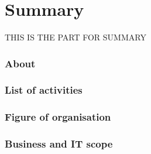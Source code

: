 \part{Summary}

THIS IS THE PART FOR SUMMARY

\section{About}

\section{List of activities}

\section{Figure of organisation}

\section{Business and IT scope}

